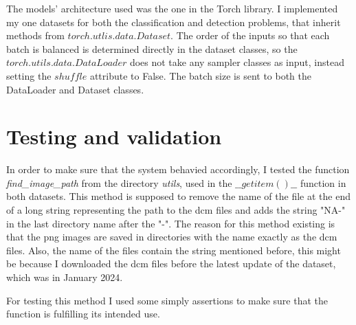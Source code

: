 The models' architecture used was the one in the Torch library. I implemented my one datasets for both the classification and detection problems, that inherit methods from $torch.utlis.data.Dataset$. The order of the inputs so that each batch is balanced is determined directly in the dataset classes, so the $torch.utils.data.DataLoader$ does not take any sampler classes as input, instead setting the $shuffle$ attribute to False. The batch size is sent to both the DataLoader and Dataset classes.

\section{Testing and validation}

In order to make sure that the system behavied accordingly, I tested the function \textit{find\_image\_path} from the directory \textit{utils}, used in the $\_\_getitem()\_\_$ function in both datasets. This method is supposed to remove the name of the file at the end of a long string representing the path to the dcm files and adds the string "NA-" in the last directory name after the "-". The reason for this method existing is that the png images are saved in directories with the name exactly as the dcm files. Also, the name of the files contain the string mentioned before, this might be because I downloaded the dcm files before the latest update of the dataset, which was in January 2024.

For testing this method I used some simply assertions to make sure that the function is fulfilling its intended use.